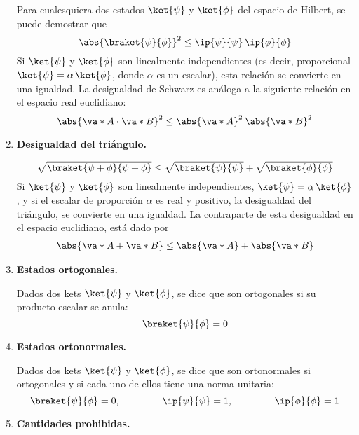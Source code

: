 \begin{enumerate}[label=\alph*)]
Para cualesquiera dos estados $\ket{\psi}$ y $\ket{\phi}$ del espacio de Hilbert, se puede demostrar que
\begin{equation}
\abs{\braket{\psi}{\phi}}^{2} \leq \ip{\psi}{\psi} \, \ip{\phi}{\phi}
\label{eq:ecuacion_02_34}
\end{equation}
Si $\ket{\psi}$ y $\ket{\phi}$ son linealmente independientes (es decir, proporcional $\ket{\psi} = \alpha \, \ket{\phi}$, donde $\alpha$ es un escalar), esta relación se convierte en una igualdad. La desigualdad de Schwarz es análoga a la siguiente relación en el espacio real euclidiano:
\begin{equation}
\abs{\va*{A} \cdot \va*{B}}^{2} \leq \abs{\va*{A}}^{2} \: \abs{\va*{B}}^{2}
\label{eq:ecuacion_02_35}
\end{equation}
\item \textbf{Desigualdad del triángulo.}

\begin{equation}
\sqrt{\braket{\psi + \phi}{\psi + \phi}} \leq \sqrt{\braket{\psi}{\psi}} + \sqrt{\braket{\phi}{\phi}}
\label{eq:ecuacion_02_36}
\end{equation}
Si $\ket{\psi}$ y $\ket{\phi}$ son linealmente independientes, $\ket{\psi} = \alpha \, \ket{\phi}$, y si el escalar de proporción $\alpha$ es real y positivo, la desigualdad del triángulo, se convierte en una igualdad. La contraparte de esta desigualdad en el espacio euclidiano, está dado por
\begin{align*}
\abs{\va*{A} +  \va*{B}} \leq \abs{\va*{A}} + \abs{\va*{B}}
\end{align*}
\item \textbf{Estados ortogonales.}

Dados dos kets $\ket{\psi}$ y $\ket{\phi}$, se dice que son ortogonales si su producto escalar se anula:
\begin{equation}
\braket{\psi}{\phi} = 0
\label{eq:ecuacion_02_37}
\end{equation}
\item \textbf{Estados ortonormales.}

Dados dos kets $\ket{\psi}$ y $\ket{\phi}$, se dice que son ortonormales si ortogonales y si cada uno de ellos tiene una norma unitaria:
\begin{equation}
\braket{\psi}{\phi} = 0, \hspace{1.5cm} \ip{\psi}{\psi} = 1, \hspace{1.5cm} \ip{\phi}{\phi} = 1
\label{eq:ecuacion_02_38}
\end{equation}
\item \textbf{Cantidades prohibidas.}


\end{enumerate}
